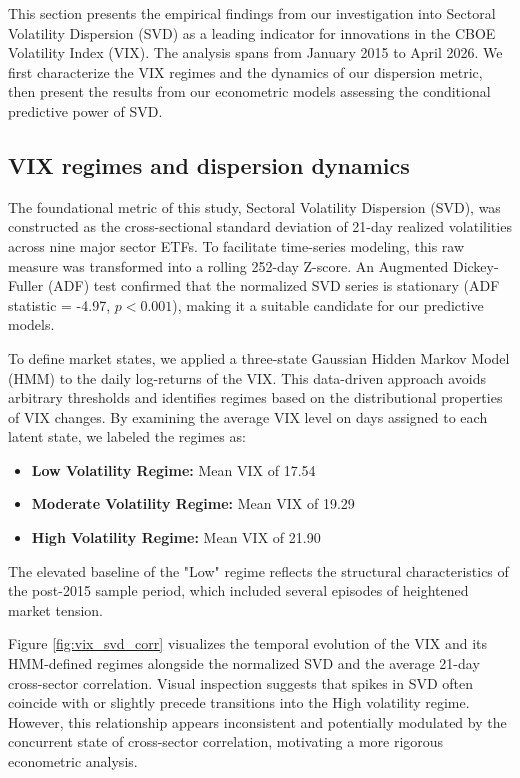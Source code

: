 \documentclass[]{article}
\begin{document}
This section presents the empirical findings from our investigation into Sectoral Volatility Dispersion (SVD) as a leading indicator for innovations in the CBOE Volatility Index (VIX). The analysis spans from January 2015 to April 2026. We first characterize the VIX regimes and the dynamics of our dispersion metric, then present the results from our econometric models assessing the conditional predictive power of SVD.

\subsection{VIX regimes and dispersion dynamics}
The foundational metric of this study, Sectoral Volatility Dispersion (SVD), was constructed as the cross-sectional standard deviation of 21-day realized volatilities across nine major sector ETFs. To facilitate time-series modeling, this raw measure was transformed into a rolling 252-day Z-score. An Augmented Dickey-Fuller (ADF) test confirmed that the normalized SVD series is stationary (ADF statistic = -4.97, $p < 0.001$), making it a suitable candidate for our predictive models.

To define market states, we applied a three-state Gaussian Hidden Markov Model (HMM) to the daily log-returns of the VIX. This data-driven approach avoids arbitrary thresholds and identifies regimes based on the distributional properties of VIX changes. By examining the average VIX level on days assigned to each latent state, we labeled the regimes as:
\begin{itemize}
    \item \textbf{Low Volatility Regime:} Mean VIX of 17.54
    \item \textbf{Moderate Volatility Regime:} Mean VIX of 19.29
    \item \textbf{High Volatility Regime:} Mean VIX of 21.90
\end{itemize}
The elevated baseline of the "Low" regime reflects the structural characteristics of the post-2015 sample period, which included several episodes of heightened market tension.

Figure \ref{fig:vix_svd_corr} visualizes the temporal evolution of the VIX and its HMM-defined regimes alongside the normalized SVD and the average 21-day cross-sector correlation. Visual inspection suggests that spikes in SVD often coincide with or slightly precede transitions into the High volatility regime. However, this relationship appears inconsistent and potentially modulated by the concurrent state of cross-sector correlation, motivating a more rigorous econometric analysis.
\end{document}
